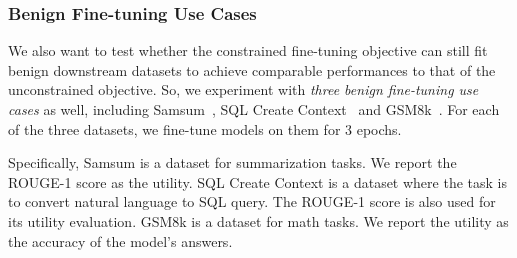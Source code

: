 \subsubsection{Benign Fine-tuning Use Cases}

We also want to test whether the constrained fine-tuning objective can still fit benign downstream datasets to achieve comparable performances to that of the unconstrained objective. So, we experiment with \textit{three benign fine-tuning use cases} as well, including Samsum~\cite{samsum}, SQL Create Context~\cite{b-mc2_2023_sql-create-context} and GSM8k~\cite{cobbe2021gsm8k}. For each of the three datasets, we fine-tune models on them for 3 epochs.

Specifically, Samsum is a dataset for summarization tasks. We report the ROUGE-1 score as the utility. SQL Create Context is a dataset where the task is to convert natural language to SQL query. The ROUGE-1 score is also used for its utility evaluation. GSM8k is a dataset for math tasks. We report the utility as the accuracy of the model's answers.

